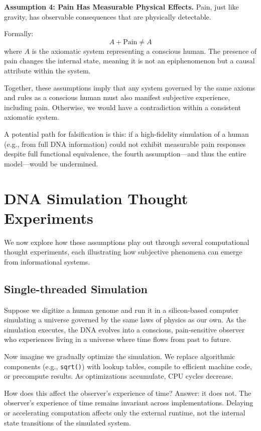 \documentclass[11pt]{article}
\begin{document}
\textbf{Assumption 4: Pain Has Measurable Physical Effects.}
Pain, just like gravity, has observable consequences that are physically detectable.

Formally:
\[
  A + \text{Pain} \neq A
\]
where \( A \) is the axiomatic system representing a conscious human. The presence of pain changes the internal state, meaning it is not an epiphenomenon but a causal attribute within the system.

\vspace{0.5em}
Together, these assumptions imply that any system governed by the same axioms and rules as a conscious human must also manifest subjective experience, including pain. Otherwise, we would have a contradiction within a consistent axiomatic system.

A potential path for falsification is this: if a high-fidelity simulation of a human (e.g., from full DNA information) could not exhibit measurable pain responses despite full functional equivalence, the fourth assumption—and thus the entire model—would be undermined.

\section{DNA Simulation Thought Experiments}

We now explore how these assumptions play out through several computational thought experiments, each illustrating how subjective phenomena can emerge from informational systems.

\subsection{Single-threaded Simulation}

Suppose we digitize a human genome and run it in a silicon-based computer simulating a universe governed by the same laws of physics as our own. As the simulation executes, the DNA evolves into a conscious, pain-sensitive observer who experiences living in a universe where time flows from past to future.

Now imagine we gradually optimize the simulation. We replace algorithmic components (e.g., \texttt{sqrt()}) with lookup tables, compile to efficient machine code, or precompute results. As optimizations accumulate, CPU cycles decrease.

How does this affect the observer's experience of time? Answer: it does not. The observer’s experience of time remains invariant across implementations. Delaying or accelerating computation affects only the external runtime, not the internal state transitions of the simulated system.
\end{document}
